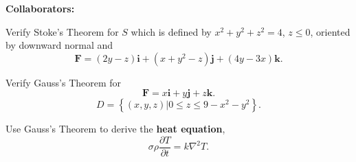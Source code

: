 \documentclass[11pt,letterpaper,boxed]{hmcpset}
\newcommand{\crb}[1]{\left\{ #1 \right\}}
\newcommand{\pdr}[2]{\frac{\partial #1}{\partial #2}}
\newcommand{\VEC}[1]{\ensuremath{\mathbf{#1}}\xspace}
\begin{document}
\noindent\textbf{Collaborators:} 


\begin{problem}[Colley 7.3 \#4]
Verify Stoke's Theorem for $S$ which is defined by $x^2+y^2+z^2=4$, $z\leq0$, oriented by downward normal and 
\[
	\VEC{F} = (2y-z)\VEC{i}+(x+y^2-z)\VEC{j}+(4y-3x)\VEC{k}.
\]
\end{problem}

\begin{solution}
\vfill
\end{solution}
\newpage

\begin{problem}[Colley 7.3 \#6]
Verify Gauss's Theorem for
\[
	\VEC{F} = x\VEC{i}+y\VEC{j}+z\VEC{k}.
\]
\[
	D = \crb{(x,y,z)|0\leq z\leq9-x^2-y^2}.
\]
\end{problem}

\begin{solution}
\vfill
\end{solution}
\newpage

\begin{problem}[Colley 7.4 \#6]
Use Gauss's Theorem to derive the \textbf{heat equation},
\[
	\sigma \rho \pdr{T}{t} = k \nabla^2T.
\]
\end{problem}

\begin{solution}
\vfill
\end{solution}
\newpage
\end{document}
